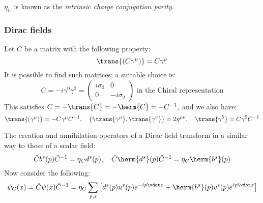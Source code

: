 \documentclass{jknotes}
\begin{document}
\(\eta_C\) is known as the \emph{intrinsic charge conjugation parity}.

\subsubsection*{Dirac fields}
Let \(C\) be a matrix with the following property:
\begin{equation}
    \trans{(C\gamma^\mu)} = C\gamma^\mu
\end{equation}
It is possible to find such matrices; a suitable choice is:
\begin{equation}
    C = -i\gamma^0\gamma^2 = 
    \begin{pmatrix}
        i\sigma_2 & 0\\
        0 & -i\sigma_2
    \end{pmatrix}
    \text{ in the Chiral representation}
\end{equation}
This satisfies \(C = -\trans{C} = -\herm{C} = -C^{-1}\), and we also have:
\begin{equation}
    \trans{(\gamma^\mu)} = -C\gamma^\mu C^{-1}
    ,\quad
    \{\trans{\gamma^\mu},\trans{\gamma^\nu}\} = 2\eta^{\mu\nu}
    ,\quad
    \trans{\gamma^5} = C\gamma^5C^{-1}
\end{equation}

The creation and annihilation operators of a Dirac field transform in a similar way to those of a scalar field:
\begin{equation}
    \hat{C}b^s(p)\hat{C}^{-1} = \eta_C d^s(p)
    ,\quad
    \hat{C}\herm{d^s}(p)\hat{C}^{-1} = \eta_C \herm{b^s}(p)
\end{equation}
Now consider the following:
\begin{equation}
    \psi_C(x) = \hat{C}\psi(x)\hat{C}^{-1} = 
    \eta_C \sum_{p,s}\left[ d^s(p)u^s(p)e^{-ip\vdot x} + \herm{b^s}(p)v^s(p)e^{ip\vdot x} \right]
\end{equation}
\end{document}
